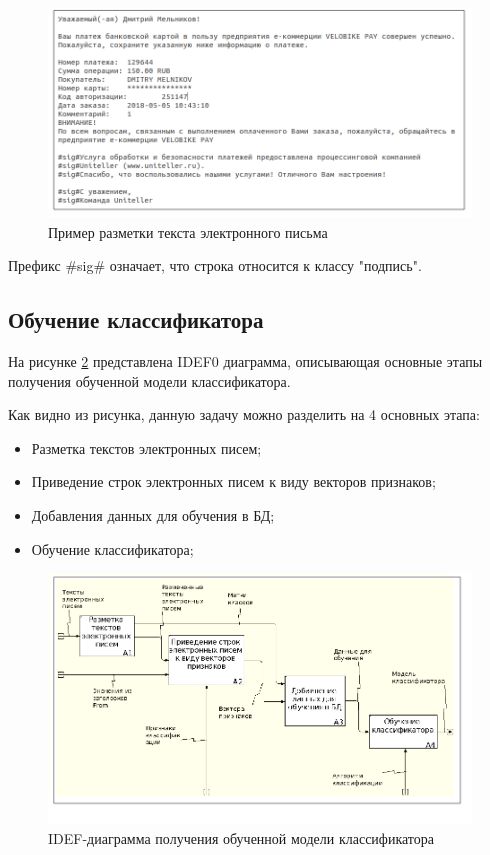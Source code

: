\begin{figure}[h!]
	\centering
	\includegraphics[width=\textwidth]{inc/img/email_dataset.png}
	\caption{Пример разметки текста электронного письма}
	\label{design:email-dataset}
\end{figure}

Префикс \#sig\# означает, что строка относится к классу "подпись". 

\subsection{Обучение классификатора}
На рисунке \ref{design:idef_1} представлена IDEF0 диаграмма, описывающая основные этапы получения обученной модели классификатора.

Как видно из рисунка, данную задачу можно разделить на 4 основных этапа:

\begin{itemize}
	\item Разметка текстов электронных писем;
	\item Приведение строк электронных писем к виду векторов признаков;
	\item Добавления данных для обучения в БД;
	\item Обучение классификатора;
\end{itemize}

\begin{figure}[h!]
	\centering
	\includegraphics[width=\textwidth]{inc/img/idef_1.png}
	\caption{IDEF-диаграмма получения обученной модели классификатора}
	\label{design:idef_1}
\end{figure}

